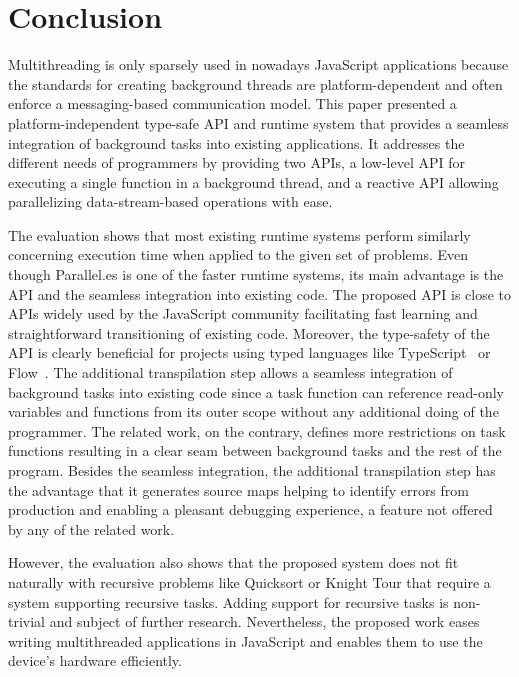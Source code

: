 \section{Conclusion}\label{sec:conclusion}
Multithreading is only sparsely used in nowadays JavaScript applications because the standards for creating background threads are platform-dependent and often enforce a messaging-based communication model. This paper presented a platform-independent type-safe API and runtime system that provides a seamless integration of background tasks into existing applications. It addresses the different needs of programmers by providing two APIs, a low-level API for executing a single function in a background thread, and a reactive API allowing parallelizing data-stream-based operations with ease. 

The evaluation shows that most existing runtime systems perform similarly concerning execution time when applied to the given set of problems. Even though Parallel.es is one of the faster runtime systems, its main advantage is the API and the seamless integration into existing code. The proposed API is close to APIs widely used by the JavaScript community facilitating fast learning and straightforward transitioning of existing code. Moreover, the type-safety of the API is clearly beneficial for projects using typed languages like TypeScript~\cite{typescript} or Flow~\cite{flow}. The additional transpilation step allows a seamless integration of background tasks into existing code since a task function can reference read-only variables and functions from its outer scope without any additional doing of the programmer. The related work, on the contrary, defines more restrictions on task functions resulting in a clear seam between background tasks and the rest of the program. Besides the seamless integration, the additional transpilation step has the advantage that it generates source maps helping to identify errors from production and enabling a pleasant debugging experience, a feature not offered by any of the related work. 

However, the evaluation also shows that the proposed system does not fit naturally with recursive problems like Quicksort or Knight Tour that require a system supporting recursive tasks. Adding support for recursive tasks is non-trivial and subject of further research. Nevertheless, the proposed work eases writing multithreaded applications in JavaScript and enables them to use the device's hardware efficiently.
